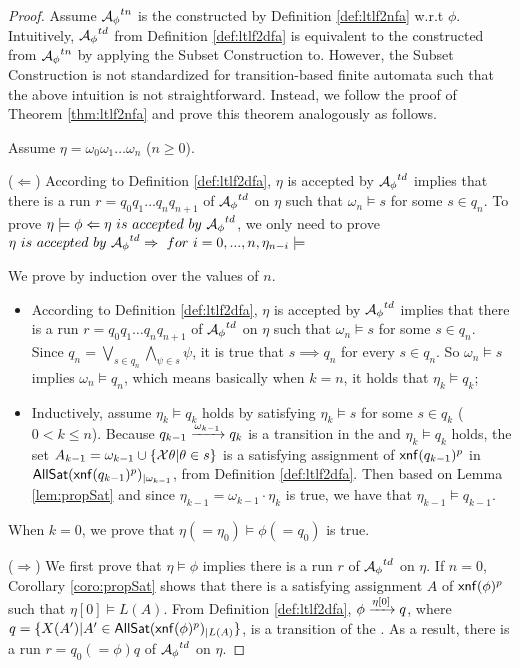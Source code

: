 \begin{proof}
Assume ${\mathcal{A}_{\phi}}^{tn}$ is the \TNFA constructed by Definition \ref{def:ltlf2nfa} w.r.t $\phi$. Intuitively, ${\mathcal{A}_{\phi}}^{td}$ from Definition \ref{def:ltlf2dfa} is equivalent to the \TDFA constructed from ${\mathcal{A}_{\phi}}^{tn}$ by applying the Subset Construction to. However, the Subset Construction is not standardized for transition-based finite automata such that the above intuition is not straightforward. Instead, we follow the proof of Theorem \ref{thm:ltlf2nfa} and prove this theorem analogously as follows.

Assume $\eta = \omega_0\omega_1\ldots\omega_n$ ($n\geq 0$). 

($\Leftarrow$) 
According to Definition \ref{def:ltlf2dfa}, $\eta$ is accepted by ${\mathcal{A}_{\phi}}^{td}$ implies that there is a run $r=q_0q_1\ldots q_n q_{n+1}$ of ${\mathcal{A}_{\phi}}^{td}$ on $\eta$ such that $\omega_n\models s$ for some $s\in q_n$.
To prove $\eta\models\phi\Leftarrow\eta\ is\ accepted\ by\  {\A_{\phi}}^{td}$, we only need to prove $\eta\ is\ accepted\ by\  {\A_{\phi}}^{td}\Rightarrow\ for\ i=0,...,n,\eta_{n-i}\models$

We prove by induction over the values of $n$.
\begin{itemize}
	\item According to Definition \ref{def:ltlf2dfa}, $\eta$ is accepted by ${\mathcal{A}_{\phi}}^{td}$ implies that there is a run $r=q_0q_1\ldots q_n q_{n+1}$ of ${\mathcal{A}_{\phi}}^{td}$ on $\eta$ such that $\omega_n\models s$ for some $s\in q_n$. Since $q_n = \bigvee_{s\in q_n}\bigwedge_{\psi\in s}\psi$, it is true that $s\implies q_n$ for every $s\in q_n$. So $\omega_n\models s$ implies $\omega_n\models q_n$, which means basically when $k = n$, it holds that $\eta_k\models q_k$;
	\item Inductively, assume $\eta_k\models q_k$ holds by satisfying $\eta_k\models s$ for some $s\in q_k$ ($0<k\leq n$). Because $q_{k-1}\xrightarrow[]{\omega_{k-1}}q_k$ is a transition in the \TDFA and $\eta_k\models q_k$ holds, the set $A_{k-1} = \omega_{k-1}\cup \{\mathcal{X}\theta | \theta\in s\}$ is a satisfying assignment of ${\sf xnf}(q_{k-1})^p$ in ${\sf AllSat}({\sf xnf}(q_{k-1})^p)_{|\omega_{k-1}}$, from Definition \ref{def:ltlf2dfa}. Then based on Lemma \ref{lem:propSat} and since $\eta_{k-1}=\omega_{k-1}\cdot\eta_k$ is true, we have that $\eta_{k-1}\models q_{k-1}$.
\end{itemize}
When $k=0$, we prove that $\eta (=\eta_0)\models \phi (=q_0)$ is true.

($\Rightarrow$) We first prove that $\eta\models\phi$ implies there is a run $r$ of ${\mathcal{A}_{\phi}}^{td}$ on $\eta$. 
If $n = 0$, Corollary \ref{coro:propSat} shows that there is a satisfying assignment $A$ of ${\sf xnf}(\phi)^p$ such that $\eta[0]\models L(A)$. From Definition \ref{def:ltlf2dfa}, $\phi\xrightarrow[]{\eta[0]}q$, where $q=\{X(A') | A'\in{\sf AllSat}({\sf xnf}(\phi)^p)_{|L(A)}\}$, is a transition of the \TDFA. As a result, there is a run $r=q_0(=\phi)q$ of ${\mathcal{A}_{\phi}}^{td}$ on $\eta$.
 

\end{proof}
